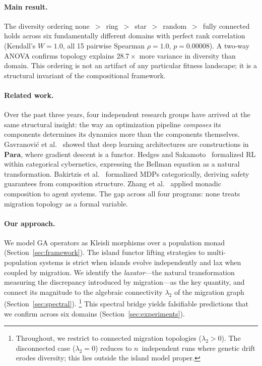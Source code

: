 \documentclass[submission,copyright,creativecommons]{eptcs}
\begin{document}
\paragraph{Main result.}
The diversity ordering
none~$>$~ring~$>$~star~$>$~random~$>$~fully connected holds across
six fundamentally different domains with perfect rank correlation
(Kendall's $W = 1.0$, all 15 pairwise Spearman $\rho = 1.0$,
$p = 0.00008$). A two-way ANOVA confirms topology explains
$28.7\times$ more variance in diversity than domain. This ordering is
not an artifact of any particular fitness landscape; it is a
structural invariant of the compositional framework.

\paragraph{Related work.}
Over the past three years, four independent research groups have
arrived at the same structural insight: the way an optimization
pipeline \emph{composes} its components determines its dynamics more
than the components themselves. Gavranovi\'{c} et
al.~\cite{gavranovic2024categorical} showed that deep learning
architectures are constructions in $\mathbf{Para}$, where gradient
descent is a functor. Hedges and
Sakamoto~\cite{hedges2024reinforcement} formalized RL within
categorical cybernetics, expressing the Bellman equation as a natural
transformation. Bakirtzis et al.~\cite{bakirtzis2024compositional}
formalized MDPs categorically, deriving safety guarantees from
composition structure. Zhang et al.~\cite{zhang2024mce} applied
monadic composition to agent systems. The gap across all four
programs: none treats migration topology as a formal variable.

\paragraph{Our approach.}
We model GA operators as Kleisli morphisms over a population monad
(Section~\ref{sec:framework}). The island functor lifting strategies
to multi-population systems is strict when islands evolve
independently and lax when coupled by migration. We identify the
\emph{laxator}---the natural transformation measuring the discrepancy
introduced by migration---as the key quantity, and connect its
magnitude to the algebraic connectivity $\lambda_2$ of the migration
graph (Section~\ref{sec:spectral}).%
\footnote{Throughout, we restrict to connected migration topologies ($\lambda_2 > 0$). The disconnected case ($\lambda_2 = 0$) reduces to $n$~independent runs where genetic drift erodes diversity; this lies outside the island model proper.}
This spectral bridge yields falsifiable predictions that we confirm
across six domains (Section~\ref{sec:experiments}).
\end{document}
